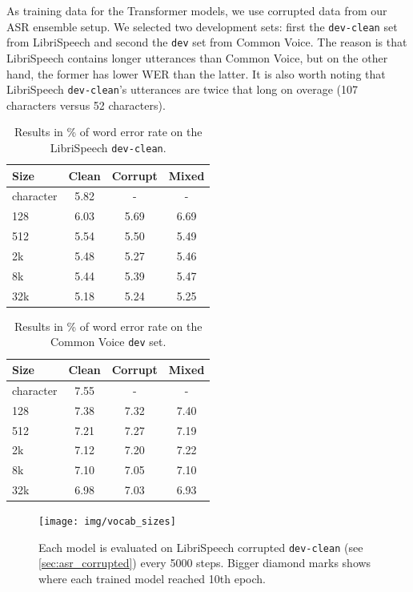 As training data for the Transformer models, we use corrupted data from our ASR ensemble setup. We selected two development sets: first the \texttt{dev-clean} set from LibriSpeech and second the \texttt{dev} set from Common Voice. The reason is that LibriSpeech contains longer utterances than Common Voice, but on the other hand, the former has lower WER than the latter. It is also worth noting that LibriSpeech \texttt{dev-clean}'s utterances are twice that long on overage (107 characters versus 52 characters).


\begin{table}[p]
	\centering
	\begin{tabular}{l|ccc}
		\bf Size & \bf Clean & \bf Corrupt & \bf Mixed \\
		\hline
		character &  5.82  &  -  &  -  \\
		128 &  6.03  &  5.69  &  6.69  \\
		512 &    5.54  &  5.50   &  5.49 \\
		2k &  5.48  & 5.27  & 5.46  \\
		8k &  5.44  &   5.39 & 5.47  \\
		32k &  5.18  & 5.24  &  5.25 \\
		
	\end{tabular}
	\caption{Results in \% of word error rate on the LibriSpeech \texttt{dev-clean}.}
	\label{tab:results_vocabularies_libri}
\end{table}

\begin{table}[p]
	\centering
	\begin{tabular}{l|ccc}
		\bf Size & \bf Clean & \bf Corrupt & \bf Mixed \\
		\hline
		character &  7.55  &  -  &  -  \\
		128 & 7.38   &  7.32  & 7.40  \\
		512 &  7.21  & 7.27   & 7.19  \\
		2k & 7.12   & 7.20 & 7.22  \\
		8k &  7.10  & 7.05  & 7.10  \\
		32k &  6.98  & 7.03  &  6.93 \\
		
	\end{tabular}
	\caption{Results in \% of word error rate on the Common Voice \texttt{dev} set.}
	\label{tab:results_vocabularies_common}
\end{table}

\begin{figure}[p]
	\texttt{[image: img/vocab\_sizes]}
	\caption{Each model is evaluated on LibriSpeech corrupted \texttt{dev-clean} (see \cref{sec:asr_corrupted}) every 5000 steps. Bigger diamond marks shows where each trained model reached 10th epoch.}
	\label{fig:vocab_sizes}
\end{figure}

